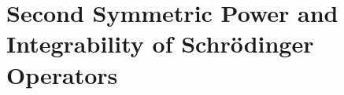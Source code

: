 \documentclass[a4paper,12pt]{article}
\newcommand{\cE}{\mathcal{E}}
\newtheorem{rem}[thm]{Remark}
\begin{document}

\section{Second Symmetric Power and Integrability of Schrödinger Ope\-ra\-tors}\label{sec-sym-power}
 
\end{document}
